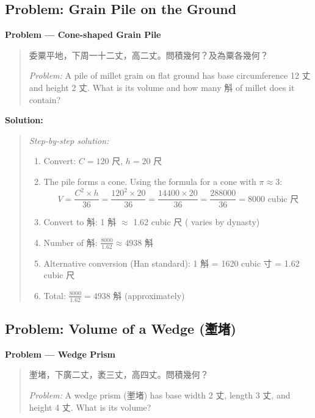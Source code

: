 \documentclass[11pt,a4paper]{article}
\newcommand{\zh}[1]{{#1}}
\newenvironment{chproblem}[1][]{%
  \par\medskip\noindent\textbf{\textcolor{sectioncolor}{#1}}\par\nopagebreak
  \begin{quote}\small
}{%
  \end{quote}\medskip
}
\newenvironment{chsolution}{%
  \par\medskip\noindent\textbf{\textcolor{notecolor}{Solution:}}\par\nopagebreak
  \begin{quote}\small
}{%
  \end{quote}\medskip
}
\newenvironment{stepbystep}{%
  \par\smallskip\noindent\textit{Step-by-step solution:}\par\nopagebreak
  \begin{enumerate}[leftmargin=2em,label=\textbf{Step \arabic*:},ref=\arabic*]
}{%
  \end{enumerate}\medskip
}
\begin{document}
\subsection{Problem: Grain Pile on the Ground}

\begin{chproblem}[Problem --- Cone-shaped Grain Pile]
\zh{委粟平地，下周一十二丈，高二丈。問積幾何？及為粟各幾何？}

\medskip
\textit{Problem:} A pile of millet grain on flat ground has base
circumference 12 \zh{丈} and height 2 \zh{丈}. What is its volume and how
many \zh{斛} of millet does it contain?
\end{chproblem}

\begin{chsolution}
\begin{stepbystep}
\item Convert: $C = 120$ \zh{尺}, $h = 20$ \zh{尺}

\item The pile forms a cone. Using the formula for a cone with $\pi \approx 3$:
\[
V = \frac{C^2 \times h}{36} = \frac{120^2 \times 20}{36} = \frac{14400 \times 20}{36} = \frac{288000}{36} = 8000 \text{ cubic \zh{尺}}
\]

\item Convert to \zh{斛}: 1 \zh{斛} $\approx$ 1.62 cubic \zh{尺} ( varies by dynasty)

\item Number of \zh{斛}: $\frac{8000}{1.62} \approx 4938$ \zh{斛}

\item Alternative conversion (Han standard): 1 \zh{斛} = 1620 cubic \zh{寸} = 1.62 cubic \zh{尺}

\item Total: $\frac{8000}{1.62} = 4938$ \zh{斛} (approximately)
\end{stepbystep}
\end{chsolution}

\subsection{Problem: Volume of a Wedge (壍堵)}

\begin{chproblem}[Problem --- Wedge Prism]
\zh{壍堵，下廣二丈，袤三丈，高四丈。問積幾何？}

\medskip
\textit{Problem:} A wedge prism (\zh{壍堵}) has base width 2 \zh{丈}, length
3 \zh{丈}, and height 4 \zh{丈}. What is its volume?
\end{chproblem}
\end{document}
